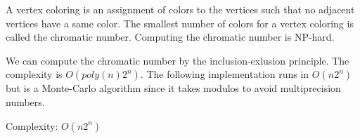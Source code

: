 A vertex coloring is an assignment of colors to the vertices
such that no adjacent vertices have a same color. The smallest
number of colors for a vertex coloring is called the chromatic
number. Computing the chromatic number is NP-hard.

We can compute the chromatic number by the inclusion-exlusion
principle. The complexity is $O(poly(n) 2^n)$. The following
implementation runs in $O(n 2^n)$ but is a Monte-Carlo algorithm 
since it takes modulos to avoid multiprecision numbers. \cite{Bjorklund}

Complexity: $O(n 2^n)$ 

\noindent \hrulefill \vspace{-\baselineskip}
\begin{multicols}{2}
\inputminted[autogobble,fontsize=\footnotesize]{C++}{Graphs/chromatic.cpp}
\end{multicols}
\vspace{-\baselineskip}
\noindent \hrulefill